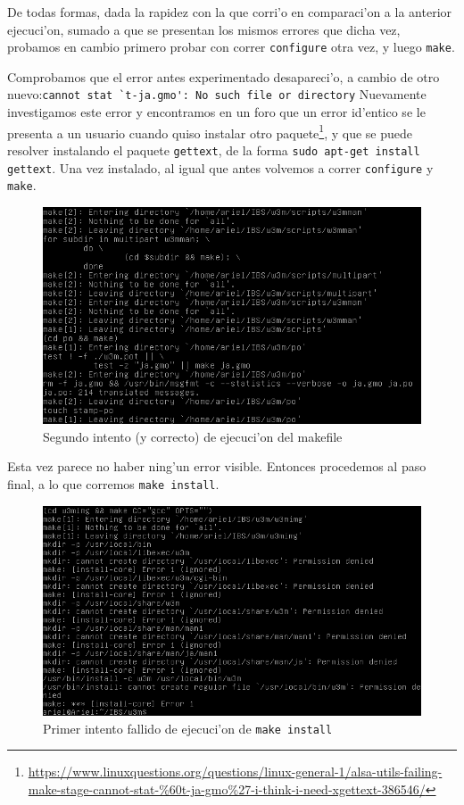 \documentclass[11pt]{article}
\begin{document}
	De todas formas, dada la rapidez con la que corri'o en comparaci'on a la anterior ejecuci'on, sumado a que se presentan los mismos errores que dicha vez, probamos en cambio primero probar con correr \texttt{configure} otra vez, y luego \texttt{make}.
	
	
	Comprobamos que el error antes experimentado desapareci'o, a cambio de otro nuevo:\enspace\verb|cannot stat `t-ja.gmo': No such file or directory| Nuevamente investigamos este error y encontramos en un foro que un error id'entico se le presenta a un usuario cuando quiso instalar otro paquete\footnote{ \url{https://www.linuxquestions.org/questions/linux-general-1/alsa-utils-failing-make-stage-cannot-stat-\%60t-ja-gmo\%27-i-think-i-need-xgettext-386546/}}, y que se puede resolver instalando el paquete \texttt{gettext}, de la forma \texttt{sudo apt-get install gettext}. Una vez instalado, al igual que antes volvemos a correr \texttt{configure} y \texttt{make}.
	
	\begin{figure}[H]
		\centering \captionsetup{justification=centering}
		\includegraphics[width=.8\linewidth]{Images/Compile_w3m/make_successful}
		\caption{Segundo intento (y correcto) de ejecuci'on del makefile}
		\label{fig:make_successful}
	\end{figure}
	
	Esta vez parece no haber ning'un error visible. Entonces procedemos al paso final, a lo que corremos \texttt{make install}.
	
	\begin{figure}[H]
		\centering \captionsetup{justification=centering}
		\includegraphics[width=.8\linewidth]{Images/Compile_w3m/make-install_fail}
		\caption{Primer intento fallido de ejecuci'on de \texttt{make install}}
		\label{fig:make-install_fail}
	\end{figure}
	
\end{document}
